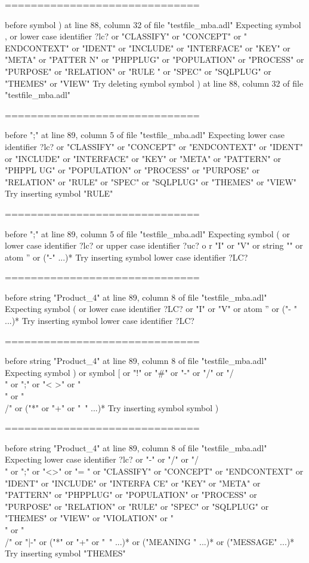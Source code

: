 \begin{description}
\begin{haskell}
==============================

before symbol ) at line 88, column 32 of file "testfile_mba.adl"
Expecting symbol , or lower case identifier ?lc? or "CLASSIFY" or "CONCEPT" or "
ENDCONTEXT" or "IDENT" or "INCLUDE" or "INTERFACE" or "KEY" or "META" or "PATTER
N" or "PHPPLUG" or "POPULATION" or "PROCESS" or "PURPOSE" or "RELATION" or "RULE
" or "SPEC" or "SQLPLUG" or "THEMES" or "VIEW"
Try deleting symbol symbol ) at line 88, column 32 of file "testfile_mba.adl"

==============================

before ";" at line 89, column 5 of file "testfile_mba.adl"
Expecting lower case identifier ?lc? or "CLASSIFY" or "CONCEPT" or "ENDCONTEXT"
or "IDENT" or "INCLUDE" or "INTERFACE" or "KEY" or "META" or "PATTERN" or "PHPPL
UG" or "POPULATION" or "PROCESS" or "PURPOSE" or "RELATION" or "RULE" or "SPEC"
or "SQLPLUG" or "THEMES" or "VIEW"
Try inserting symbol "RULE"

==============================

before ";" at line 89, column 5 of file "testfile_mba.adl"
Expecting symbol ( or lower case identifier ?lc? or upper case identifier ?uc? o
r "I" or "V" or string "" or atom '' or ("-" ...)*
Try inserting symbol lower case identifier ?LC?

==============================

before string "Product_4" at line 89, column 8 of file "testfile_mba.adl"
Expecting symbol ( or lower case identifier ?LC? or "I" or "V" or atom '' or ("-
" ...)*
Try inserting symbol lower case identifier ?LC?

==============================

before string "Product_4" at line 89, column 8 of file "testfile_mba.adl"
Expecting symbol ) or symbol [ or "!" or "#" or "-" or "/" or "/\\" or ";" or "<
>" or "\\" or "\\/" or ("*" or "+" or "~" ...)*
Try inserting symbol symbol )

==============================

before string "Product_4" at line 89, column 8 of file "testfile_mba.adl"
Expecting lower case identifier ?lc? or "-" or "/" or "/\\" or ";" or "<>" or "=
" or "CLASSIFY" or "CONCEPT" or "ENDCONTEXT" or "IDENT" or "INCLUDE" or "INTERFA
CE" or "KEY" or "META" or "PATTERN" or "PHPPLUG" or "POPULATION" or "PROCESS" or
 "PURPOSE" or "RELATION" or "RULE" or "SPEC" or "SQLPLUG" or "THEMES" or "VIEW"
or "VIOLATION" or "\\" or "\\/" or "|-" or ("*" or "+" or "~" ...)* or ("MEANING
" ...)* or ("MESSAGE" ...)*
Try inserting symbol "THEMES"


\end{haskell}
\end{description}
